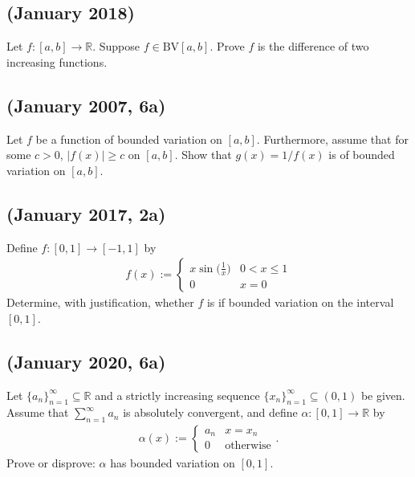 \hypertarget{january-2018}{%
\subsection{(January 2018)}\label{january-2018}}

Let \(f \colon [a,b] \to \mathbb{R}\). Suppose \(f \in \text{BV}[a,b]\).
Prove \(f\) is the difference of two increasing functions.

\hypertarget{january-2007-6a}{%
\subsection{(January 2007, 6a)}\label{january-2007-6a}}

Let \(f\) be a function of bounded variation on \([a,b]\). Furthermore,
assume that for some \(c>0\), \(|f(x)| \geq c\) on \([a,b]\). Show that
\(g(x) = 1/f(x)\) is of bounded variation on \([a,b]\).

\hypertarget{january-2017-2a}{%
\subsection{(January 2017, 2a)}\label{january-2017-2a}}

Define \(f \colon [0,1] \to [-1,1]\) by
\begin{align*}f(x):= \begin{cases} x\sin\big({\frac{1}{x}}\big) & 0 < x \leq 1 \\ 0 & x = 0 \end{cases}\end{align*}
Determine, with justification, whether \(f\) is if bounded variation on
the interval \([0,1]\).

\hypertarget{january-2020-6a}{%
\subsection{(January 2020, 6a)}\label{january-2020-6a}}

Let \(\{a_n\}_{n=1}^\infty \subseteq \mathbb{R}\) and a strictly
increasing sequence \(\{x_n\}_{n=1}^\infty \subseteq (0,1)\) be given.
Assume that \(\sum_{n=1}^\infty a_n\) is absolutely convergent, and
define \(\alpha \colon [0,1] \to \mathbb{R}\) by
\begin{align*}\alpha(x):= \begin{cases} a_n &  x=x_n \\ 0 & \text{otherwise} \end{cases}.\end{align*}
Prove or disprove: \(\alpha\) has bounded variation on \([0,1]\).

